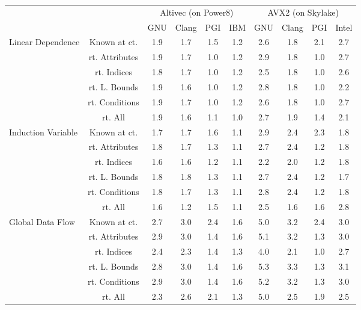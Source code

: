 \documentclass{article}
\begin{document}
\begin{longtable}{|p{2cm}||c|c|c|c|c|c|c|c|c|}
\cline{3-10} \multicolumn{2}{c|}{} & \multicolumn{4}{|c|}{ Altivec (on Power8)} & \multicolumn{4}{|c|}{ AVX2 (on Skylake)} \\
\cline{3-10} \multicolumn{2}{c|}{}& GNU & Clang & PGI & IBM & GNU & Clang & PGI & Intel \\ \hline
\multirow{6}{*}{ \parbox{2cm}{Linear Dependence}} & Known at ct. & 1.9 & 1.7 & 1.5 & 1.2 & 2.6 & 1.8 & 2.1 & 2.7\\ \cline{2-10}
 & rt. Attributes & 1.9 & 1.7 & 1.0 & 1.2 & 2.9 & 1.8 & 1.0 & 2.7\\ \cline{2-10}
 & rt. Indices & 1.8 & 1.7 & 1.0 & 1.2 & 2.5 & 1.8 & 1.0 & 2.6\\ \cline{2-10}
 & rt. L. Bounds & 1.9 & 1.6 & 1.0 & 1.2 & 2.8 & 1.8 & 1.0 & 2.2\\ \cline{2-10}
 & rt. Conditions & 1.9 & 1.7 & 1.0 & 1.2 & 2.6 & 1.8 & 1.0 & 2.7\\ \cline{2-10}
 & rt. All & 1.9 & 1.6 & 1.1 & 1.0 & 2.7 & 1.9 & 1.4 & 2.1\\ \cline{2-10}
\hline
\multirow{6}{*}{ \parbox{2cm}{Induction Variable}} & Known at ct. & 1.7 & 1.7 & 1.6 & 1.1 & 2.9 & 2.4 & 2.3 & 1.8\\ \cline{2-10}
 & rt. Attributes & 1.8 & 1.7 & 1.3 & 1.1 & 2.7 & 2.4 & 1.2 & 1.8\\ \cline{2-10}
 & rt. Indices & 1.6 & 1.6 & 1.2 & 1.1 & 2.2 & 2.0 & 1.2 & 1.8\\ \cline{2-10}
 & rt. L. Bounds & 1.8 & 1.8 & 1.3 & 1.1 & 2.7 & 2.4 & 1.2 & 1.7\\ \cline{2-10}
 & rt. Conditions & 1.8 & 1.7 & 1.3 & 1.1 & 2.8 & 2.4 & 1.2 & 1.8\\ \cline{2-10}
 & rt. All & 1.6 & 1.2 & 1.5 & 1.1 & 2.5 & 1.6 & 1.6 & 2.8\\ \cline{2-10}
\hline
\multirow{6}{*}{ \parbox{2cm}{Global Data Flow}} & Known at ct. & 2.7 & 3.0 & 2.4 & 1.6 & 5.0 & 3.2 & 2.4 & 3.0\\ \cline{2-10}
 & rt. Attributes & 2.9 & 3.0 & 1.4 & 1.6 & 5.1 & 3.2 & 1.3 & 3.0\\ \cline{2-10}
 & rt. Indices & 2.4 & 2.3 & 1.4 & 1.3 & 4.0 & 2.1 & 1.0 & 2.7\\ \cline{2-10}
 & rt. L. Bounds & 2.8 & 3.0 & 1.4 & 1.6 & 5.3 & 3.3 & 1.3 & 3.1\\ \cline{2-10}
 & rt. Conditions & 2.9 & 3.0 & 1.4 & 1.6 & 5.2 & 3.2 & 1.3 & 3.0\\ \cline{2-10}
 & rt. All & 2.3 & 2.6 & 2.1 & 1.3 & 5.0 & 2.5 & 1.9 & 2.5\\ \cline{2-10}

\end{longtable}
\end{document}
